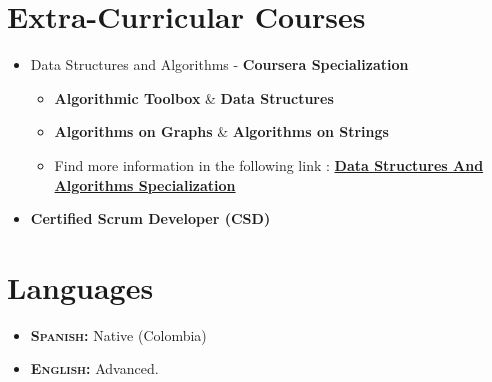 \documentclass[a4paper,11pt]{article} %
\begin{document}
\section{Extra-Curricular Courses}
\begin{itemize}
\item Data Structures and Algorithms - \textbf{Coursera Specialization}
\begin{itemize}
\item \textbf{Algorithmic Toolbox} \& \textbf{Data Structures}
\iffalse
\textbf{Summary:} Introduction to different kind of algorithms (Divide and Conquer, Dynamic Programming, Greedy Algorithms, etc). The idea of the course is to provide the students with tools to affront different kind of problems and the best way to solve them.\\
\fi
\iffalse
\textbf{Summary:} This course gives a definition of many common data structures, including Arrays, Stacks, Trees, Dynamic Arrays, Priority Queues, Disjoint Sets, Binary Search Trees (Search Trees, AVL Trees, Splays Trees). Also, this course gives a good explanation about how those structures work and are implemented in the most common programming languages.\\
\fi
\item \textbf{Algorithms on Graphs} \& \textbf{Algorithms on Strings}
\iffalse
\textbf{Summary:} Explanation about graphs and their properties, starting from how is the best way to represent them taking into account the number of nodes and edges, going through how to traverse a graph, find a shortest path and minimum spanning tree. Time and space complexity are the main factor of the described algorithms.
\fi
\iffalse
\textbf{Summary:} This course is oriented to Science and how to use string algorithms to solve many genetic problems. In this course one does see topics like Suffix Tree, Suffix Array, KMP and Burrows-Wheeler Transformation. Each module of the course give the complexity and how the algorithms were evolving from some previous one in order to improve time and memory.
\fi
\item Find more information in the following link : \href{https://www.coursera.org/specializations/data-structures-algorithms}{\textbf{Data Structures And Algorithms Specialization}}
\end{itemize}
\item \textbf{Certified Scrum Developer (CSD)}
\end{itemize}


\section{Languages}
\begin{itemize}
\item \textsc{\textbf{Spanish:}} Native (Colombia)
\item \textsc{\textbf{English:}} Advanced.
\end{itemize}
\end{document}
